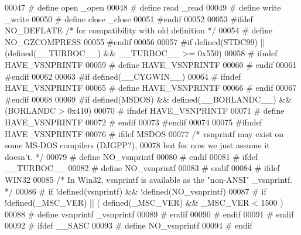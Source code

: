 \begin{DoxyCode}
00047 \textcolor{preprocessor}{#  define open \_open}
00048 \textcolor{preprocessor}{#  define read \_read}
00049 \textcolor{preprocessor}{#  define write \_write}
00050 \textcolor{preprocessor}{#  define close \_close}
00051 \textcolor{preprocessor}{#endif}
00052 
00053 \textcolor{preprocessor}{#ifdef NO\_DEFLATE       }\textcolor{comment}{/* for compatibility with old definition */}\textcolor{preprocessor}{}
00054 \textcolor{preprocessor}{#  define NO\_GZCOMPRESS}
00055 \textcolor{preprocessor}{#endif}
00056 
00057 \textcolor{preprocessor}{#if defined(STDC99) || (defined(\_\_TURBOC\_\_) && \_\_TURBOC\_\_ >= 0x550)}
00058 \textcolor{preprocessor}{#  ifndef HAVE\_VSNPRINTF}
00059 \textcolor{preprocessor}{#    define HAVE\_VSNPRINTF}
00060 \textcolor{preprocessor}{#  endif}
00061 \textcolor{preprocessor}{#endif}
00062 
00063 \textcolor{preprocessor}{#if defined(\_\_CYGWIN\_\_)}
00064 \textcolor{preprocessor}{#  ifndef HAVE\_VSNPRINTF}
00065 \textcolor{preprocessor}{#    define HAVE\_VSNPRINTF}
00066 \textcolor{preprocessor}{#  endif}
00067 \textcolor{preprocessor}{#endif}
00068 
00069 \textcolor{preprocessor}{#if defined(MSDOS) && defined(\_\_BORLANDC\_\_) && (BORLANDC > 0x410)}
00070 \textcolor{preprocessor}{#  ifndef HAVE\_VSNPRINTF}
00071 \textcolor{preprocessor}{#    define HAVE\_VSNPRINTF}
00072 \textcolor{preprocessor}{#  endif}
00073 \textcolor{preprocessor}{#endif}
00074 
00075 \textcolor{preprocessor}{#ifndef HAVE\_VSNPRINTF}
00076 \textcolor{preprocessor}{#  ifdef MSDOS}
00077 \textcolor{comment}{/* vsnprintf may exist on some MS-DOS compilers (DJGPP?),}
00078 \textcolor{comment}{   but for now we just assume it doesn't. */}
00079 \textcolor{preprocessor}{#    define NO\_vsnprintf}
00080 \textcolor{preprocessor}{#  endif}
00081 \textcolor{preprocessor}{#  ifdef \_\_TURBOC\_\_}
00082 \textcolor{preprocessor}{#    define NO\_vsnprintf}
00083 \textcolor{preprocessor}{#  endif}
00084 \textcolor{preprocessor}{#  ifdef WIN32}
00085 \textcolor{comment}{/* In Win32, vsnprintf is available as the "non-ANSI" \_vsnprintf. */}
00086 \textcolor{preprocessor}{#    if !defined(vsnprintf) && !defined(NO\_vsnprintf)}
00087 \textcolor{preprocessor}{#      if !defined(\_MSC\_VER) || ( defined(\_MSC\_VER) && \_MSC\_VER < 1500 )}
00088 \textcolor{preprocessor}{#         define vsnprintf \_vsnprintf}
00089 \textcolor{preprocessor}{#      endif}
00090 \textcolor{preprocessor}{#    endif}
00091 \textcolor{preprocessor}{#  endif}
00092 \textcolor{preprocessor}{#  ifdef \_\_SASC}
00093 \textcolor{preprocessor}{#    define NO\_vsnprintf}
00094 \textcolor{preprocessor}{#  endif}

\end{DoxyCode}

